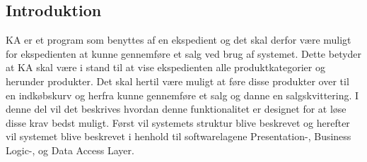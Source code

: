 \subsection{Introduktion}
\gls{KA} er et program som benyttes af en ekspedient og det skal derfor være muligt for ekspedienten at kunne gennemføre et salg ved brug af systemet. Dette betyder at \gls{KA} skal være i stand til at vise ekspedienten alle produktkategorier og herunder produkter. Det skal hertil være muligt at føre disse produkter over til en indkøbskurv og herfra kunne gennemføre et salg og danne en salgskvittering. I denne del vil det beskrives hvordan denne funktionalitet er designet for at løse disse krav bedst muligt. Først vil systemets struktur blive beskrevet og herefter vil systemet blive beskrevet i henhold til softwarelagene Presentation-, Business Logic-, og Data Access Layer.\\

